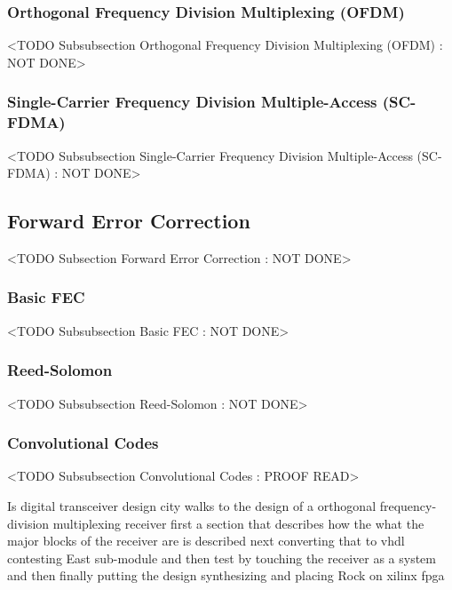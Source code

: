 \subsubsection{Orthogonal Frequency Division Multiplexing (OFDM)}
	<TODO Subsubsection  Orthogonal Frequency Division Multiplexing (OFDM) : NOT DONE>

\subsubsection{Single-Carrier Frequency Division Multiple-Access (SC-FDMA)}
	<TODO Subsubsection  Single-Carrier Frequency Division Multiple-Access (SC-FDMA) : NOT DONE>

\subsection{Forward Error Correction}
	<TODO Subsection Forward Error Correction : NOT DONE>

\subsubsection{Basic FEC}
	<TODO Subsubsection  Basic FEC : NOT DONE>

\subsubsection{Reed-Solomon}
	<TODO Subsubsection  Reed-Solomon : NOT DONE>

\subsubsection{Convolutional Codes}
	<TODO Subsubsection  Convolutional Codes : PROOF READ>

Is digital transceiver design city walks to the design of a orthogonal frequency-division multiplexing receiver first a section that describes how the what the major blocks of the receiver are is described next converting that to vhdl contesting East sub-module and then test by touching the receiver as a system and then finally putting the design synthesizing and placing Rock on xilinx fpga

